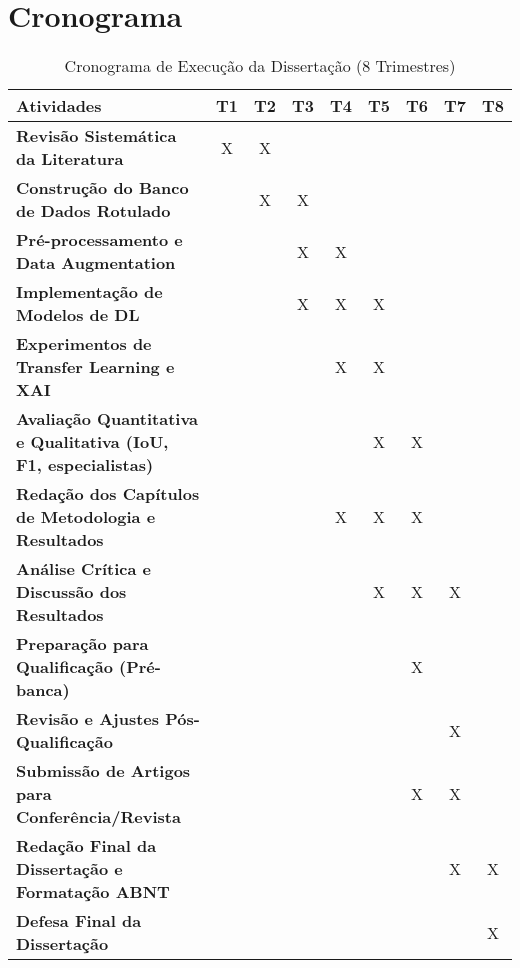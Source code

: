 \chapter{Cronograma}

\begin{table}[htb]
    \centering
    \caption{Cronograma de Execução da Dissertação (8 Trimestres)}
    \label{tab:cronograma}
    \begin{tabular}{p{5.5cm} *{8}{c}}
        \toprule
        \textbf{Atividades} & \textbf{T1} & \textbf{T2} & \textbf{T3} & \textbf{T4} & \textbf{T5} & \textbf{T6} & \textbf{T7} & \textbf{T8} \\
        \midrule
        \textbf{Revisão Sistemática da Literatura} & X & X &  &  &  &  &  &  \\
        \addlinespace
        \textbf{Construção do Banco de Dados Rotulado} &  & X & X &  &  &  &  &  \\
        \addlinespace
        \textbf{Pré-processamento e Data Augmentation} &  &  & X & X &  &  &  &  \\
        \addlinespace
        \textbf{Implementação de Modelos de DL} &  &  & X & X & X &  &  &  \\
        \addlinespace
        \textbf{Experimentos de Transfer Learning e XAI} &  &  &  & X & X &  &  &  \\
        \addlinespace
        \textbf{Avaliação Quantitativa e Qualitativa (IoU, F1, especialistas)} &  &  &  &  & X & X &  &  \\
        \addlinespace
        \midrule
        \textbf{Redação dos Capítulos de Metodologia e Resultados} &  &  &  & X & X & X &  &  \\
        \addlinespace
        \textbf{Análise Crítica e Discussão dos Resultados} &  &  &  &  & X & X & X &  \\
        \addlinespace
        \textbf{Preparação para Qualificação (Pré-banca)} &  &  &  &  &  & X &  &  \\
        \addlinespace
        \textbf{Revisão e Ajustes Pós-Qualificação} &  &  &  &  &  &  & X &  \\
        \addlinespace
        \textbf{Submissão de Artigos para Conferência/Revista} &  &  &  &  &  & X & X &  \\
        \addlinespace
        \textbf{Redação Final da Dissertação e Formatação ABNT} &  &  &  &  &  &  & X & X \\
        \addlinespace
        \textbf{Defesa Final da Dissertação} &  &  &  &  &  &  &  & X \\
        \bottomrule
    \end{tabular}
\end{table}
